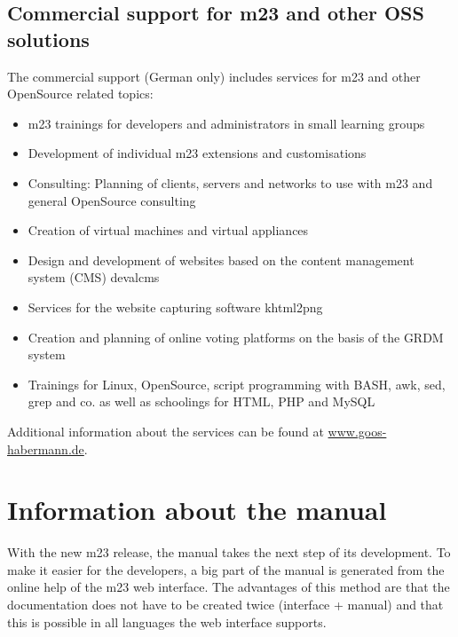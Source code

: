 \subsection{Commercial support for m23 and other OSS solutions}
The commercial support (German only) includes services for m23 and other OpenSource related topics:
\begin{itemize}
\item m23 trainings for developers and administrators in small learning groups
\item Development of individual m23 extensions and customisations
\item Consulting: Planning of clients, servers and networks to use with m23 and general OpenSource consulting
\item Creation of virtual machines and virtual appliances
\item Design and development of websites based on the content management system (CMS) devalcms
\item Services for the website capturing software khtml2png
\item Creation and planning of online voting platforms on the basis of the GRDM system
\item Trainings for Linux, OpenSource, script programming with BASH, awk, sed, grep and co. as well as schoolings for HTML, PHP and MySQL
\end{itemize}
Additional information about the services can be found at \underline{www.goos-habermann.de}.



\section{Information about the manual}
With the new m23 release, the manual takes the next step of its development. To make it easier for the developers, a big part of the manual is generated from the online help of the m23 web interface. The advantages of this method are that the documentation does not have to be created twice (interface + manual) and that this is possible in all languages the web interface supports.